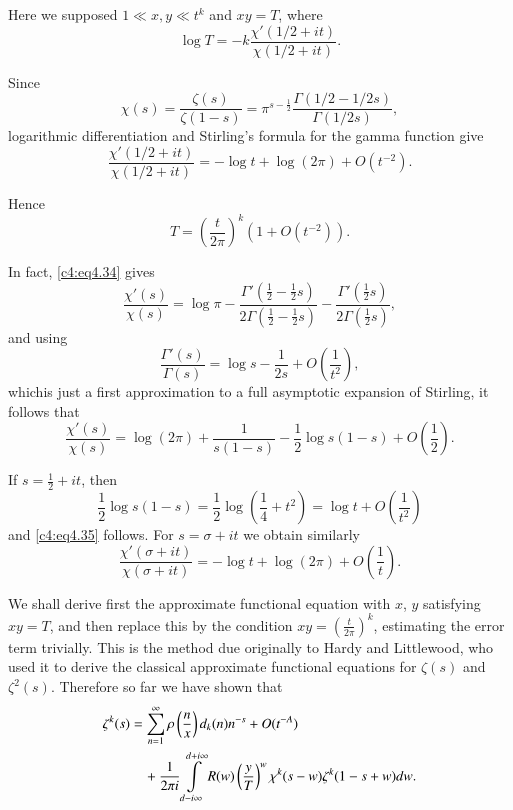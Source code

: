 Here we supposed $1 \ll x, y \ll t^k$ and $xy =T$, where
\begin{equation}
  \log T = - k \frac{\chi'(1/2+ it)}{\chi(1/2+ it)}.\label{c4:eq4.33} 
\end{equation}

Since 
\begin{equation}
  \chi(s) = \frac{\zeta(s)}{\zeta(1-s)} = \pi^{s- \frac{1}{2}}
  \frac{\Gamma (1/2 -1/2s)}{\Gamma (1/2 s)},\label{c4:eq4.34}
\end{equation}
logarithmic differentiation and Stirling's formula for the gamma
function give
\begin{equation}
  \frac{\chi' (1/2 + it)}{\chi(1/2 + it)}=- \log t + \log (2 \pi) +
  O(t^{-2}).\label{c4:eq4.35} 
\end{equation}

Hence 
\begin{equation}
  T= \left(\frac{t}{2 \pi}\right)^k (1+ O (t^{-2})).\label{c4:eq4.36} 
\end{equation}

In fact, \eqref{c4:eq4.34} gives
$$  
\frac{\chi' (s)}{\chi(s)} = \log \pi  - \frac{\Gamma' (\frac{1}{2}-
  \frac{1}{2} s)}{2 \Gamma (\frac{1}{2} - \frac{1}{2} s)} -
\frac{\Gamma' (\frac{1}{2}s)}{2 \Gamma (\frac{1}{2}s)},
$$
and using 
$$ 
\frac{\Gamma'(s)}{\Gamma (s)} = \log s - \frac{1}{2s} + O
\left(\frac{1}{t^2}\right),
$$ 
which\pageoriginale is just a first approximation to a full asymptotic expansion of
Stirling, it follows that
$$ 
\frac{\chi' (s)}{\chi(s)} = \log (2 \pi) + \frac{1}{s(1-s)} -\frac{1}{2} \log s (1-s) + 
O   \left(\frac{1}{2} \right).
$$

If $s= \frac{1}{2} + it$, then 
$$
\frac{1}{2} \log s(1-s)= \frac{1}{2} \log \left(\frac{1}{4} + t^2
\right) = \log t + O \left(\frac{1}{t^2} \right)
$$
and \eqref{c4:eq4.35} follows. For $s= \sigma + it$ we obtain
similarly
\begin{equation}
  \frac{\chi'(\sigma+ it)}{\chi (\sigma + it)} =- \log t + \log (2 \pi)
  + O\left( \frac{1}{t}\right).\label{c4:eq4.37}
\end{equation}

We shall derive first the approximate functional equation with $x$,
$y$ satisfying $xy=T$, and then replace this by the condition $xy =
\left(\frac{t}{2 \pi} \right)^k$, estimating the error term
trivially. This is the method due originally to Hardy and Littlewood,
who used it to derive the classical approximate functional equations
for $\zeta (s)$ and $\zeta^2 (s)$. Therefore so far we have shown that
\begin{align}
  \zeta^k (s) & = \sum_{n=1}^\infty \rho\left(\frac{n}{x} \right)d_k (n)
  n^{-s} + O(t^{-A})\notag\\ 
  & \quad+ \frac{1}{2 \pi i} \int\limits_{d- i \infty}^{d+
  i \infty} R(w) \left( \frac{y}{T}\right)^w \chi^k (s-w) \zeta^k (1-
  s+w)dw.\label{c4:eq4.38}
\end{align}

